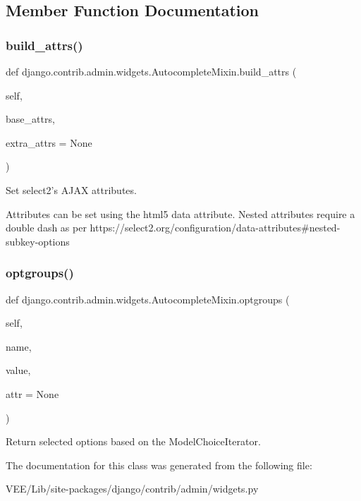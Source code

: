 \subsection{Member Function Documentation}
\mbox{\label{classdjango_1_1contrib_1_1admin_1_1widgets_1_1_autocomplete_mixin_a176090ce6f09cb6a66c1c8cd9bcc11f4}} 
\subsubsection{\texorpdfstring{build\+\_\+attrs()}{build\_attrs()}}
{\footnotesize\ttfamily def django.\+contrib.\+admin.\+widgets.\+Autocomplete\+Mixin.\+build\+\_\+attrs (\begin{DoxyParamCaption}\item[{}]{self,  }\item[{}]{base\+\_\+attrs,  }\item[{}]{extra\+\_\+attrs = {\ttfamily None} }\end{DoxyParamCaption})}

\begin{DoxyVerb}Set select2's AJAX attributes.

Attributes can be set using the html5 data attribute.
Nested attributes require a double dash as per
https://select2.org/configuration/data-attributes#nested-subkey-options
\end{DoxyVerb}
 \mbox{\label{classdjango_1_1contrib_1_1admin_1_1widgets_1_1_autocomplete_mixin_a8fecb93266bf420ef2ec7c5f6a553573}} 
\subsubsection{\texorpdfstring{optgroups()}{optgroups()}}
{\footnotesize\ttfamily def django.\+contrib.\+admin.\+widgets.\+Autocomplete\+Mixin.\+optgroups (\begin{DoxyParamCaption}\item[{}]{self,  }\item[{}]{name,  }\item[{}]{value,  }\item[{}]{attr = {\ttfamily None} }\end{DoxyParamCaption})}

\begin{DoxyVerb}Return selected options based on the ModelChoiceIterator.\end{DoxyVerb}
 

The documentation for this class was generated from the following file\+:\begin{DoxyCompactItemize}
\item 
V\+E\+E/\+Lib/site-\/packages/django/contrib/admin/widgets.\+py\end{DoxyCompactItemize}
